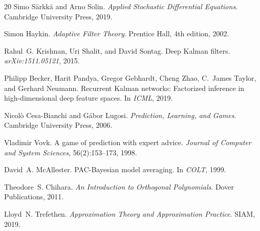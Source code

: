 \documentclass[11pt]{article}
\begin{document}
\begin{thebibliography}{20}
Simo S\"arkk\"a and Arno Solin.
\newblock \emph{Applied Stochastic Differential Equations}.
\newblock Cambridge University Press, 2019.

Simon Haykin.
\newblock \emph{Adaptive Filter Theory}.
\newblock Prentice Hall, 4th edition, 2002.

Rahul~G. Krishnan, Uri Shalit, and David Sontag.
\newblock Deep Kalman filters.
\newblock \emph{arXiv:1511.05121}, 2015.

Philipp Becker, Harit Pandya, Gregor Gebhardt, Cheng Zhao, C.~James Taylor, and Gerhard Neumann.
\newblock Recurrent Kalman networks: Factorized inference in high-dimensional deep feature spaces.
\newblock In \emph{ICML}, 2019.

Nicol\`o Cesa-Bianchi and G\'abor Lugosi.
\newblock \emph{Prediction, Learning, and Games}.
\newblock Cambridge University Press, 2006.

Vladimir Vovk.
\newblock A game of prediction with expert advice.
\newblock \emph{Journal of Computer and System Sciences}, 56(2):153--173, 1998.

David~A. McAllester.
\newblock PAC-Bayesian model averaging.
\newblock In \emph{COLT}, 1999.

Theodore~S. Chihara.
\newblock \emph{An Introduction to Orthogonal Polynomials}.
\newblock Dover Publications, 2011.

Lloyd~N. Trefethen.
\newblock \emph{Approximation Theory and Approximation Practice}.
\newblock SIAM, 2019.

\end{thebibliography}
\end{document}
